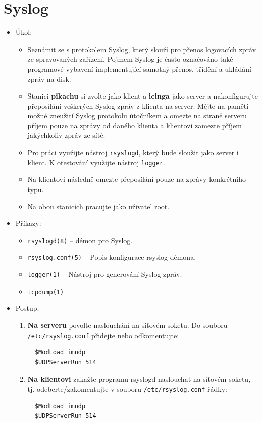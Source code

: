\section{Syslog}
  \begin{itemize}
    \item Úkol: 
    \begin{itemize}
      \item Seznámit se s protokolem Syslog, který slouží pro přenos
      logovacích zpráv ze spravovaných zařízení. Pojmem Syslog je často označováno také
      programové vybavení implementující samotný přenos, třídění a ukládání zpráv na disk.
      \item Stanici \textbf{pikachu} si zvolte jako klient a \textbf{icinga} jako server a 
      nakonfigurujte přeposílání veškerých Syslog zpráv z klienta na server. Mějte na paměti 
      možné zneužití Syslog protokolu útočníkem a omezte na straně serveru příjem pouze na 
      zprávy od daného klienta a klientovi zamezte příjem jakýchkoliv zpráv ze sítě.
      \item Pro práci využijte nástroj {\tt rsyslogd}, který bude sloužit jako server i klient.
      K otestování využijte nástroj {\tt logger}.
      \item Na klientovi následně omezte přeposílání pouze na zprávy konkrétního typu.
      \item Na obou stanicích pracujte jako uživatel root.
    \end{itemize}
    \item Příkazy:
       \begin{itemize}
            \item {\tt rsyslogd(8)} -- démon pro Syslog.
            \item {\tt rsyslog.conf(5)} -- Popis konfigurace rsyslog démona.
            \item {\tt logger(1)} -- Nástroj pro generování Syslog zpráv.
            \item {\tt tcpdump(1)}
        \end{itemize}
    \item Postup:
       \begin{enumerate}
            \item {\bf Na serveru} povolte naslouchání na síťovém soketu. Do souboru {\tt /etc/rsyslog.conf} přidejte nebo odkomentujte:
\begin{verbatim}
  $ModLoad imudp
  $UDPServerRun 514
\end{verbatim}

            \item {\bf Na klientovi} zakažte programu rsyslogd naslouchat na síťovém soketu,
tj. odeberte/zakomentujte v souboru {\tt /etc/rsyslog.conf} řádky:
\begin{verbatim}
  $ModLoad imudp
  $UDPServerRun 514


\end{verbatim}
\end{enumerate}
\end{itemize}
